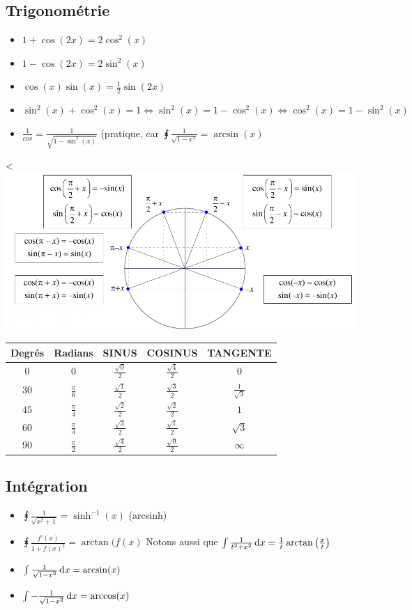 \documentclass[12pt,a4paper]{article}
\renewcommand{\)}{\right)}
\renewcommand{\(}{\left(}
\begin{document}
\subsection{Trigonométrie}
\begin{itemize}
	\item $1+\cos(2x) = 2\cos^2(x)$
	\item $1-\cos(2x) = 2\sin^2(x)$
	\item $\cos(x)\sin(x) = \frac{1}{2}\sin(2x)$
	\item $\sin^2(x)+\cos^2(x) = 1 \iff \sin^2(x) = 1-\cos^2(x) \iff \cos^2(x) = 1-\sin^2(x)$
	\item $\frac{1}{cos} = \frac{1}{\sqrt{1-\sin^2(x)}}$ (pratique, car $\intx{}{}{\frac{1}{\sqrt{1-x^2}}} = \arcsin(x)$
\end{itemize}
<\includegraphics[scale=0.5]{trigo}\\
\begin{tabular}{c|c|c|c|c}
Degrés & Radians & SINUS & COSINUS & TANGENTE\\
\hline
$0$ & $0$ & $\frac{\sqrt{0}}{2}$ & $\frac{\sqrt{4}}{2}$ & $0$\\
\hline
$30$ & $\frac{\pi}{6}$ & $\frac{\sqrt{1}}{2}$ & $\frac{\sqrt{3}}{2}$ & $\frac{1}{\sqrt{3}}$\\
\hline
$45$ & $\frac{\pi}{4}$ & $\frac{\sqrt{2}}{2}$ & $\frac{\sqrt{2}}{2}$ & $1$\\
\hline
$60$ & $\frac{\pi}{3}$ & $\frac{\sqrt{3}}{2}$ & $\frac{\sqrt{1}}{2}$ & $\sqrt{3}$\\
\hline
$90$ & $\frac{\pi}{2}$ & $\frac{\sqrt{4}}{2}$ & $\frac{\sqrt{0	}}{2}$ & $\infty$\\

\end{tabular}
\subsection{Intégration}
\begin{itemize}
	\item 	$\intx{}{}{\frac{1}{\sqrt{x^2+1}}} = \sinh^{-1}(x)$ (arcsinh)
	\item 	$\intx{}{}{\frac{f'(x)}{1+f(x)^2}} = \arctan(f(x)$ Notons aussi que $\int \frac{1}{t^2 + x^2} \deriv{x} = \frac{1}{t}\arctan\(\frac{x}{t}\)$
	\item 	$\int\frac{1}{\sqrt{1-x^2}} \, \mathrm d x = \arcsin(x)$
	\item 	$\int-\frac{1}{\sqrt{1-x^2}}\, \mathrm d x = \arccos(x)$
\end{itemize}
\end{document}
